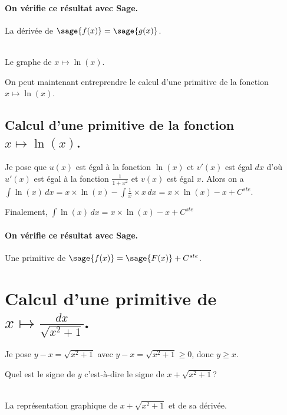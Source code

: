 \documentclass[a4paper,12pt]{report}
\begin{document}
\paragraph{On vérifie ce résultat avec Sage.}
La dérivée de $\sage{f(x)} = \sage{g(x)} $.
\begin{center}
 \\
Le graphe de $x \mapsto \ln(x) $.
\end{center}


On peut maintenant entreprendre le calcul d'une primitive de la  fonction  $x \mapsto \ln(x) $.
\subsection{Calcul d'une primitive de la fonction  $x \mapsto \ln(x) $.}
Je pose que $u(x)$  est égal à la fonction $\ln(x)$ et $v'(x)$ est égal $dx$  d'où $u'(x)$  est égal à la fonction $ \frac{1}{1+ x^2} $ et $v(x)$ est égal $x$.
Alors on a $\int \ln(x) \, dx = x \times \ln(x) -\int \frac{1}{x} \times x \, dx = x \times \ln(x) - x + C^{ste} $.

Finalement, $\int \ln(x) \, dx = x \times \ln(x) -x + C^{ste} $
\paragraph{On vérifie ce résultat avec Sage.}
Une primitive de $\sage{f(x)} = \sage{F(x)} + C^{ste} $.



\section{Calcul d'une primitive de $ x \longmapsto  \frac{dx}{\sqrt{x^2 + 1} } $. }


Je pose $y-x = \sqrt{x^2+1} $ avec $y - x = \sqrt{x^2 + 1} \geqslant 0 $, donc $y \geqslant  x$.

Quel est le signe de $y$ c'est-à-dire le signe de $x + \sqrt{x^2+1} $?

\begin{center}
 \\
La représentation graphique de $x + \sqrt{x^2+1}$ et de sa dérivée.
\end{center}
\end{document}
